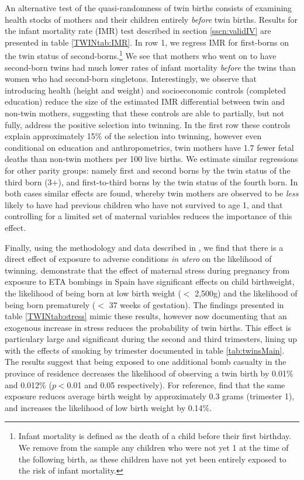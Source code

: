 \documentclass[subeqn]{article}
\begin{document}
\begin{spacing}{1.4}
An alternative test of the quasi-randomness of twin births consists of examining
health stocks of mothers and their children entirely \emph{before} twin births.
Results for the infant mortality rate (IMR) test described in section
\ref{sscn:validIV} are presented in table \ref{TWINtab:IMR}. In row 1, we regress
IMR for first-borns on the twin status of second-borns.\footnote{Infant mortality
  is defined as the death of a child before their first birthday. We remove from
  the sample any children who were not yet 1 at the time of the following birth,
  as these children have not yet been entirely exposed to the risk of infant
  mortality.}  We see that mothers who went on to have second-born twins had much
lower rates of infant mortality \emph{before} the twins than women who had
second-born singletons.  Interestingly, we observe that introducing health (height
and weight) and socioeconomic controls (completed education) reduce the size of
the estimated IMR differential between twin and non-twin mothers, suggesting that
these controls are able to partially, but not fully, address the positive
selection into twinning.  In the first row these controls explain approximately
15\% of the selection into twinning, however even conditional on education and
anthropometrics, twin mothers have 1.7 fewer fetal deaths than non-twin mothers
per 100 live births.  We estimate similar regressions for other parity groups:
namely first and second borns by the twin status of the third born (3+), and
first-to-third borns by the twin status of the fourth born.  In both cases
similar effects are found, whereby twin mothers are observed to be \emph{less}
likely to have had previous children who have not survived to age 1, and that
controlling for a limited set of maternal variables reduces the importance of
this effect.

Finally, using the methodology and data described in \citet{QuintanaRodenas2014},
we find that there is a direct effect of exposure to adverse conditions
\emph{in utero} on the likelihood of twinning.  \citet{QuintanaRodenas2014}
demonstrate that the effect of maternal stress during pregnancy from exposure to
ETA bombings in Spain have significant effects on child birthweight, the
likelihood of being born at low birth weight ($<$ 2,500g) and the likelihood of
being born prematurely ($<$ 37 weeks of gestation).  The findings presented
in table \ref{TWINtab:stress} mimic these results, however now documenting
that an exogenous increase in stress reduces the probability of twin births.
This effect is particulary large and significant during the second and third
trimesters, lining up with the effects of smoking by trimester documented in
table \ref{tab:twinsMain}.  The results suggest that being exposed to one
additional bomb casualty in the province of residence decreases the likelihood
of observing a twin birth by 0.01\% and 0.012\% ($p<$0.01 and 0.05 respectively).
For reference, \citet{QuintanaRodenas2014} find that the same exposure reduces
average birth weight by approximately 0.3 grams (trimester 1), and increases
the likelihood of low birth weight by 0.14\%.


\end{spacing}
\end{document}
